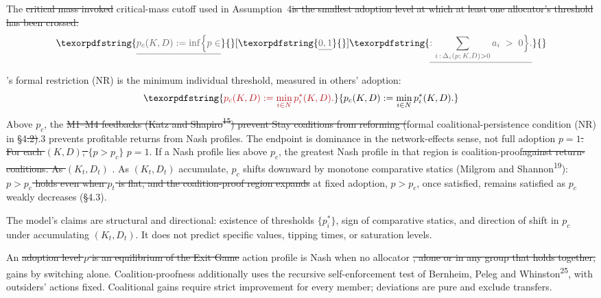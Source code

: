 \documentclass[12pt]{article}
\theoremstyle{definition}
\theoremstyle{remark}
\providecommand{\DIFaddtex}[1]{{\color{AddedText}#1}}
\providecommand{\DIFdeltex}[1]{{\color{DeletedText}\sout{#1}}}
\providecommand{\DIFaddbegin}{}
\providecommand{\DIFaddend}{}
\providecommand{\DIFdelbegin}{}
\providecommand{\DIFdelend}{}
\providecommand{\DIFadd}[1]{\texorpdfstring{\DIFaddtex{#1}}{#1}} %
\providecommand{\DIFdel}[1]{\texorpdfstring{\DIFdeltex{#1}}{}} %
\begin{document}
The \DIFdelbegin \DIFdel{critical mass invoked }\DIFdelend \DIFaddbegin \DIFadd{critical-mass cutoff used }\DIFaddend in Assumption~4\DIFdelbegin \DIFdel{is the smallest adoption level at which at least one allocator's threshold has been crossed:
}\[
\DIFdel{p_c(K, D) := \inf\Bigl\{ p \in }[\DIFdel{0, 1}] \DIFdel{: \sum_{i\,:\,\Delta_i(p;\,K,D) > 0} a_i \;>\; 0 \Bigr\}.
}\]%
\DIFdelend \DIFaddbegin \DIFadd{'s formal restriction (NR) is the minimum individual threshold, measured in others' adoption:
}\[
\DIFadd{p_c(K,D):=\min_{i\in N}p_i^*(K,D).
}\]\DIFaddend 
Above $p_c$, the \DIFdelbegin \DIFdel{M1--M4 feedbacks (Katz and Shapiro\textsuperscript{15}) prevent Stay coalitions from reforming (}\DIFdelend \DIFaddbegin \DIFadd{formal coalitional-persistence condition (NR) in }\DIFaddend \S4\DIFdelbegin \DIFdel{.2)}\DIFdelend \DIFaddbegin \DIFadd{.3 prevents profitable returns from Nash profiles}\DIFaddend . The endpoint is dominance in the network-effects sense, not full adoption \DIFdelbegin \DIFdel{$p = 1$. For each $(K, D)$, $\{p > p_c\}$ }\DIFdelend \DIFaddbegin \DIFadd{$p=1$. If a Nash profile lies above $p_c$, the greatest Nash profile in that region }\DIFaddend is coalition-proof\DIFdelbegin \DIFdel{against return-coalitions. As $(K_t, D_t)$ }\DIFdelend \DIFaddbegin \DIFadd{. As $(K_t,D_t)$ }\DIFaddend accumulate, $p_c$ shifts downward by monotone comparative statics (Milgrom and Shannon\textsuperscript{19}): \DIFdelbegin \DIFdel{$p > p_c$ holds even when $p_t$ is flat, and the coalition-proof region expands }\DIFdelend \DIFaddbegin \DIFadd{at fixed adoption, $p>p_c$, once satisfied, remains satisfied as $p_c$ weakly decreases }\DIFaddend (\S4.3).

The model's claims are structural and directional: existence
of thresholds $\{p_i^*\}$, sign of comparative statics, and
direction of shift in $p_c$ under accumulating $(K_t, D_t)$.
It does not predict specific values, tipping times, or
saturation levels.

An \DIFdelbegin \DIFdel{adoption level $p$ is an equilibrium of the Exit Game }\DIFdelend \DIFaddbegin \DIFadd{action profile is Nash }\DIFaddend when no allocator \DIFdelbegin \DIFdel{, alone or in any group that holds together, }\DIFdelend gains by switching \DIFaddbegin \DIFadd{alone. Coalition-proofness additionally uses the recursive self-enforcement test of Bernheim, Peleg and Whinston\textsuperscript{25}, with outsiders' actions fixed. Coalitional gains require strict improvement for every member; deviations are pure and exclude transfers}\DIFaddend .
\end{document}
